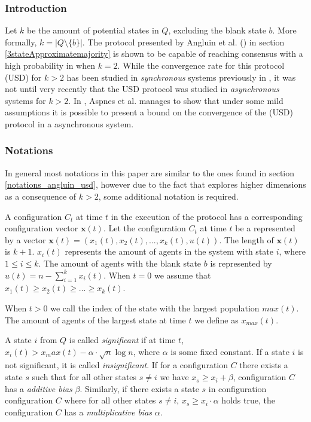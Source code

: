  \subsubsection{Introduction}
Let $k$ be the amount of potential states in $Q$, excluding the blank state $b$. More formally, $k = |Q \setminus \{b\}|$. The protocol presented by Angluin et al. (\cite{angluinSimplePopulationProtocol2008}) in section \ref{3stateApproximatemajority} is shown to be capable of reaching consensus with a high probability in  when $k = 2$. While the convergence rate for this protocol (USD) for $k > 2$ has been studied in \emph{synchronous} systems previously in \cite{becchetti2015}, it was not until very recently that the USD protocol was studied in \emph{asynchronous} systems for $k > 2$. In \cite{AspnesFastConverganceOfKOpinion2023}, Aspnes et al. manages to show that under some mild assumptions it is possible to present a bound on the convergence of the (USD) protocol in a asynchronous system. 

\subsubsection{Notations}

In general most notations in this paper are similar to the ones found in section \ref{notations_angluin_usd}, however due to the fact that \cite{AspnesFastConverganceOfKOpinion2023} explores higher dimensions as a consequence of $k > 2$, some additional notation is required.

A configuration $C_t$ at time $t$ in the execution of the protocol has a corresponding configuration vector $\textbf{x}(t)$. Let the configuration $C_t$ at time $t$ be a represented by a vector $\textbf{x}(t) = (x_1(t), x_2(t), ..., x_k(t), u(t))$. The length of $\textbf{x}(t)$ is $k + 1$. $x_i(t)$ represents the amount of agents in the system with state $i$, where $1 \leq i \leq k$. The amount of agents with the blank state $b$ is represented by $u(t) = n - \sum_{i=1}^k x_i(t)$. When $t = 0$ we assume that $x_1(t) \geq x_2(t) \geq ... \geq x_k(t)$. 

When $t > 0$ we call the index of the state with the largest population $max(t)$. The amount of agents of the largest state at time $t$ we define as $x_{max}(t)$. 

A state $i$ from $Q$ is called \emph{significant} if at time $t$, $x_i(t) > x_max(t) - \alpha \cdot \sqrt{n} \log n$, where $\alpha$ is some fixed constant. If a state $i$ is not significant, it is called \emph{insignificant}. If for a configuration $C$ there exists a state $s$ such that for all other states $s \neq i$ we have $x_s \geq x_i + \beta$, configuration $C$ has a \emph{additive bias} $\beta$. Similarly, if there exists a state $s$ in configuration configuration $C$ where for all other states $s \neq i$, 
$x_s \geq x_i \cdot \alpha$ holds true, the configuration $C$ has a \emph{multiplicative bias} $\alpha$. 

